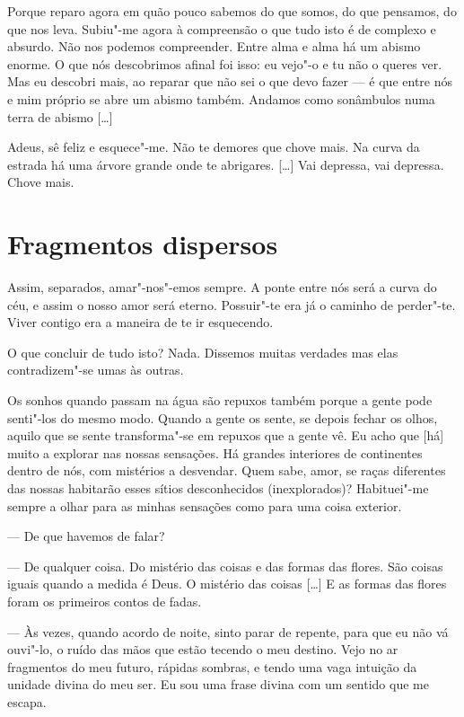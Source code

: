  Porque reparo agora em quão pouco sabemos do que somos, do que
pensamos, do que nos leva. Subiu"-me agora à compreensão o que tudo
isto é de complexo e absurdo. Não nos podemos compreender. Entre alma
e alma há um abismo enorme. O que nós descobrimos afinal foi isso: eu
vejo"-o e tu não o queres ver. Mas eu descobri mais, ao reparar que
não sei o que devo fazer --- é que entre nós e mim próprio se abre um
abismo também. Andamos como sonâmbulos numa terra de abismo [\ldots{}]

 Adeus, sê feliz e esquece"-me. Não te demores que chove mais. Na
curva da estrada há uma árvore grande onde te abrigares. [\ldots{}] Vai
depressa, vai depressa. Chove mais.

\hfill{}


\section{Fragmentos dispersos}

 Assim, separados, amar"-nos"-emos sempre. A ponte entre nós será a
curva do céu, e assim o nosso amor será eterno. Possuir"-te era já o
caminho de perder"-te. Viver contigo era a maneira de te ir
esquecendo.

O que concluir de tudo isto? Nada. Dissemos muitas verdades mas elas
contradizem"-se umas às outras.

Os sonhos quando passam na água são repuxos também porque a gente pode
senti"-los do mesmo modo. Quando a gente os sente, se depois fechar os
olhos, aquilo que se sente transforma"-se em repuxos que a gente vê.
Eu acho que [há] muito a explorar nas nossas sensações. Há grandes
interiores de continentes dentro de nós, com mistérios a desvendar.
Quem sabe, amor, se raças diferentes das nossas habitarão esses
sítios desconhecidos (inexplorados)? Habituei"-me sempre a olhar para
as minhas sensações como para uma coisa exterior.

--- De que havemos de falar?

--- De qualquer coisa. Do mistério das coisas e das formas das flores.
São coisas iguais quando a medida é Deus. O mistério das coisas [\ldots{}]
E as formas das flores foram os primeiros contos de fadas.

--- Às vezes, quando acordo de noite, sinto parar de repente, para que
eu não vá ouvi"-lo, o ruído das mãos que estão tecendo o meu destino.
Vejo no ar fragmentos do meu futuro, rápidas sombras, e tendo uma
vaga intuição da unidade divina do meu ser. Eu sou uma frase divina
com um sentido que me escapa.

